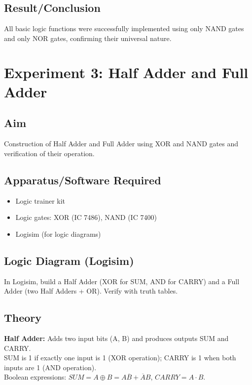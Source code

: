 \documentclass[11pt]{article}
\begin{document}
\subsection{Result/Conclusion}
All basic logic functions were successfully implemented using only NAND gates and only NOR gates, confirming their universal nature.

\newpage
\section{Experiment 3: Half Adder and Full Adder}

\subsection{Aim}
Construction of Half Adder and Full Adder using XOR and NAND gates and verification of their operation.

\subsection{Apparatus/Software Required}
\begin{itemize}
    \item Logic trainer kit
    \item Logic gates: XOR (IC 7486), NAND (IC 7400)
    \item Logisim (for logic diagrams)
\end{itemize}
\subsection{Logic Diagram (Logisim)}
In Logisim, build a Half Adder (XOR for SUM, AND for CARRY) and a Full Adder (two Half Adders + OR). Verify with truth tables.


\subsection{Theory}
\textbf{Half Adder:} Adds two input bits (A, B) and produces outputs SUM and CARRY.
\\SUM is 1 if exactly one input is 1 (XOR operation); CARRY is 1 when both inputs are 1 (AND operation).
\\Boolean expressions: \; $SUM = A\oplus B = A\overline{B} + \overline{A}B$,\; $CARRY = A\cdot B$.
\end{document}
